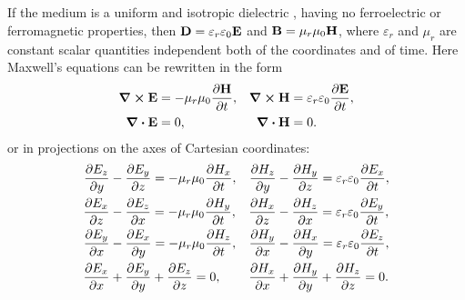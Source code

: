  \subsection{}\label{31.1.2} If the medium is a uniform and isotropic dielectric , having no ferroelectric  or ferromagnetic  properties, then $\vb{D} = \varepsilon_{r}\varepsilon_{0}\vb{E}$ and $\vb{B} = \mu_{r}\mu_{0}\vb{H}$, where
$\varepsilon_{r}$ and $\mu_{r}$ are constant scalar quantities independent both of the coordinates and of time. Here Maxwell's equations  can be rewritten in the form
\[
\begin{alignedat}{2}
\curl \vb{E} & = - \mu_{r} \mu_{0} \pdv{\vb{H}}{t}, & \quad \curl \vb{H} & = \varepsilon_{r} \varepsilon_{0} \pdv{\vb{E}}{t}, \\
\div \vb{E} & = 0,                                 & \quad \div \vb{H} & = 0.
\end{alignedat}
\]
or in projections on the axes of Cartesian coordinates:
\[
\begin{alignedat}{2}
\pdv{E_{z}}{y}& - \pdv{E_{y}}{z}  = - \mu_{r} \mu_{0} \pdv{H_{x}}{t}, 
& \quad \pdv{H_{z}}{y} & - \pdv{H_{y}}{z}  = \varepsilon_{r} \varepsilon_{0} \pdv{E_{x}}{t}, \\
\pdv{E_{x}}{z} & - \pdv{E_{z}}{x} = - \mu_{r} \mu_{0} \pdv{H_{y}}{t}, 
& \quad \pdv{H_{x}}{z} & - \pdv{H_{z}}{x} = \varepsilon_{r} \varepsilon_{0} \pdv{E_{y}}{t}, \\
\pdv{E_{y}}{x} & - \pdv{E_{x}}{y} = - \mu_{r} \mu_{0} \pdv{H_{z}}{t}, 
& \quad \pdv{H_{y}}{x} & - \pdv{H_{x}}{y} = \varepsilon_{r} \varepsilon_{0} \pdv{E_{z}}{t},\\
\pdv{E_{x}}{x} & + \pdv{E_{y}}{y} + \pdv{E_{z}}{z} = 0, & \quad \pdv{H_{x}}{x} & + \pdv{H_{y}}{y} + \pdv{H_{z}}{z}  = 0. 
\end{alignedat}
\]

